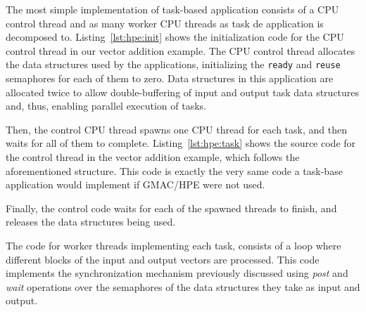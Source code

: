 

The most simple implementation of task\hyp{}based application consists of a CPU control thread and 
as many worker CPU threads as task de application is decomposed to. Listing~\ref{lst:hpe:init} shows 
the initialization code for the CPU control thread in our vector addition example. The CPU control 
thread allocates the data structures used by the applications, initializing the \texttt{ready} and 
\texttt{reuse} semaphores for each of them to zero. Data structures in this application are 
allocated twice to allow double\hyp{}buffering of input and output task data structures and, thus, 
enabling parallel execution of tasks.



Then, the control CPU thread spawns one CPU thread for each task, and then waits for all of them to 
complete. Listing~\ref{lst:hpe:task} shows the source code for the control thread in the vector 
addition example, which follows the aforementioned structure. This code is exactly the very same 
code a task\hyp{}base application would implement if GMAC\slash HPE were not used.


Finally, the control code waits for each of the spawned threads to finish, and releases the data 
structures being used.

The code for worker threads implementing each task, consists of a loop where different blocks of the 
input and output vectors are processed. This code implements the synchronization mechanism 
previously discussed using \emph{post} and \emph{wait} operations over the semaphores of the data 
structures they take as input and output.

